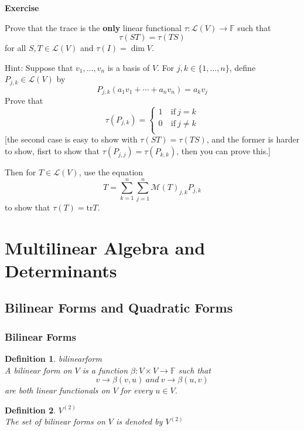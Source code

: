 \documentclass{article}
\newtheorem{definition}{Definition}[subsection]
\newenvironment{exercise}{%
{\textbf{Exercise\\}
    }
}{
}
\newcommand{\FF}{\mathbb{F}}
\newcommand{\tr}{\text{tr}}
\begin{document}
\begin{CJK}{UTF8}{gkai}
\begin{exercise}
    Prove that the trace is the \textbf{only} linear functional $\tau: \mathcal{L}(V) \to \FF$ such that
    \[\tau(ST) = \tau(TS)\]
    for all $S,T \in \mathcal{L}(V)$ and $\tau(I) = \dim V$.

    Hint: Suppose that $v_1,\ldots,v_n$ is a basis of $V$. For $j,k \in \{1,\ldots,n\}$, define $P_{j,k} \in \mathcal{L}(V)$ by 
    \[P_{j,k}(a_1v_1 + \cdots +a_n v_n) = a_k v_j\]
    Prove that
    \[\tau(P_{j,k}) = \begin{cases}
        1 & ~\text{if}~ j = k\\
        0 & ~\text{if}~ j \neq k\\
    \end{cases}\]
    [the second case is easy to show with $\tau(ST) = \tau(TS)$, and the former is harder to show, fisrt to show that $\tau(P_{j,j}) = \tau(P_{k,k})$, then you can prove this.]

    Then for $T \in \mathcal{L}(V)$, use the equation 
    \[T = \sum_{k = 1}^{n}\sum_{j = 1}^{n}\mathcal{M}(T)_{j,k} P_{j,k}\]
    to show that $\tau(T) = \tr T$.
\end{exercise}


\section{Multilinear Algebra and Determinants}

\subsection{Bilinear Forms and Quadratic Forms}

\subsubsection{Bilinear Forms}

\begin{definition}
    bilinearform\\

    A bilinear form on $V$ is a function $\beta: V \times V \to \FF$ such that
    \[v\to\beta(v,u) ~and~ v\to\beta(u,v)\]
    are both linear functionals on $V$ for every $u\in V$.
\end{definition}

\begin{definition}
    $V^{(2)}$\\

    The set of bilinear forms on $V$ is denoted by $V^{(2)}$
\end{definition}


\end{CJK}
\end{document}
